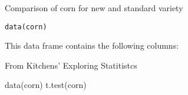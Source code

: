 \begin{Description}\relax
Comparison of corn for new and standard variety
\end{Description}
\begin{Usage}
\begin{verbatim}data(corn)\end{verbatim}
\end{Usage}
\begin{Format}\relax
This data frame contains the following columns:
\end{Format}
\begin{Source}\relax
From Kitchens' Exploring Statitistcs
\end{Source}
\begin{Examples}
\begin{ExampleCode}
data(corn)
t.test(corn)
\end{ExampleCode}
\end{Examples}


